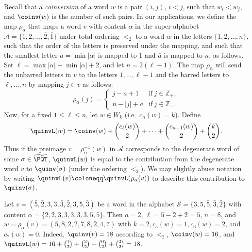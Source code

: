 Recall that a {\em coinversion} of a word $w$ is a pair $(i,j)$, $i < j$, such that $w_i < w_j$, and $\coinv(w)$ is the number of such pairs. In our applications, we define the map $\rho_{\alpha}$ that maps a word $v$ with content $\alpha$ in the super-alphabet $\mathcal{A}=\{1,2,\ldots,\bar{2},\bar{1}\}$ under total ordering $<_2$ to a word $w$ in the letters $\{1,2,\ldots,n\}$, such that the order of the letters is preserved under the mapping, and such that the smallest letter $a=\min |\alpha|$ is mapped to 1 and $\bar{a}$ is mapped to $n$, as follows. Set $\ell=\max |\alpha|-\min |\alpha|+2$, and let $n=2(\ell-1)$. The map $\rho_{\alpha}$ will send the unbarred letters in $v$ to the letters $1,\ldots,\ell-1$ and the barred letters to $\ell, \dots, n$ by mapping $j \in v$ as follows: 
\[
\rho_{\alpha}(j)= \begin{cases}
j-a + 1 & \mbox{if}\ j\in\mathbb{Z}_+,\\
n-|j|+a & \mbox{if}\ j\in\mathbb{Z}_-.
\end{cases}
\] 
Now, for a fixed $1 \leq \ell \leq n$, let $w\in W_k$ (i.e.~$c_n(w)=k$). Define
\begin{equation}
\label{word-quinv-def}
\quinvL(w) = \coinv(w) + \binom{c_\ell(w)}{2} + \cdots + \binom{c_{n-1}(w)}{2} +\binom{k}{2}.
\end{equation}
Thus if the preimage $v=\rho_{\alpha}^{-1}(w)$ in $\mathcal{A}$ corresponds to the degenerate word of some $\sigma \in \widetilde{\PQT}$, $\quinvL(w)$ is equal to the contribution from the degenerate word $v$ to $\quinv(\sigma)$ (under the ordering $<_2$). We may slightly abuse notation by writing $\quinvL(v)\coloneqq 
\quinvL(\rho_{\alpha}(v))$ to describe this contribution to $\quinv(\sigma)$.

\begin{example}
Let $v=(\bar{5},\bar{2},3,3,\bar{3},\bar{2},3,5,\bar{3})$ be a word in the alphabet $\mathcal{S}=\{3,5,\bar5,\bar3,\bar2\}$ with content $\alpha=\{\bar{2},\bar{2},3,3,3,\bar{3},\bar{3},5,\bar{5}\}$. Then $a=2$, $\ell=5-2+2=5$, $n=8$, and $w=\rho_{\alpha}(v)=(5,8,2,2,7,8,2,4,7)$ with $k=2, c_5(w)=1, c_6(w)=2$, and $c_7(w)=0$. Indeed, $\quinv(v)=18$ according to $<_2$, $\coinv(w)=16$, and $\quinvL(w)=16+{1 \choose 2}+{2 \choose 2}+{0 \choose 2}+{2 \choose 2}=18$. 
\end{example}


